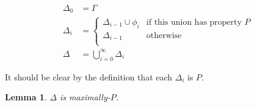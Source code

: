 \documentclass[12pt]{article}
\newtheorem{lemma}[theorem]{Lemma}
\theoremstyle{definition}
\theoremstyle{remark}
\begin{document}
\begin{equation*} \label{eq1}
\begin{split}
\Delta_0 & = \Gamma \\
\Delta_i & = 
	\begin{cases}
		\Delta_{i - 1} \cup \phi_i & \text{if this union has property } P \\
		\Delta_{i - 1} & \text{otherwise} \\
	\end{cases} \\
\Delta & = \bigcup\limits_{i=0}^{\infty} \Delta_i
\end{split}
\end{equation*}

It should be clear by the definition that each $\Delta_i$ is $P$.

\begin{lemma}
	$\Delta$ is maximally-$P$.
\end{lemma}
\end{document}
